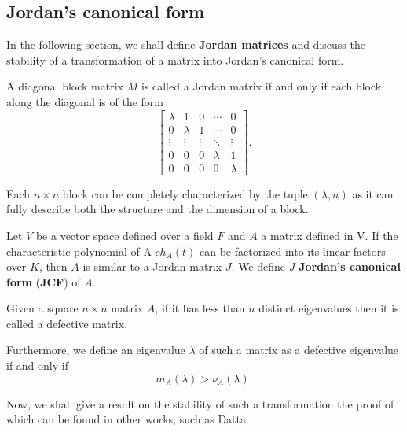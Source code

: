 \subsection*{Jordan's canonical form}
In the following section, we shall define \textbf{Jordan matrices} and discuss the stability of a transformation of a matrix
into Jordan's canonical form.
\begin{definition}
    A diagonal block matrix $M$ is called a Jordan matrix if and only if each block along the diagonal is of the form
    \[
        \begin{bmatrix}
            \lambda     &    1         &    0     &   \cdots   &    0    \\
                0       &    \lambda   &    1     &   \cdots   &    0    \\
            \vdots      &    \vdots    &  \vdots  &   \ddots   & \vdots  \\
                0       &       0      &     0    &  \lambda   &    1    \\
                0       &       0      &     0    &     0      & \lambda
        \end{bmatrix}.
    \]

    Each \(n \times n\) block can be completely characterized by the tuple \((\lambda, n)\) as it can fully describe both
    the structure and the dimension of a block.
\end{definition}

\begin{remark}
    Let \(V\) be a vector space defined over a field \(F\) and \(A\) a matrix defined in V. If the characteristic
    polynomial of A \(ch_{A}(t)\) can be factorized into its linear factors over \(K\), then \(A\) is similar to a
    Jordan matrix \(J\). We define \(J\) \textbf{Jordan's canonical form} (\textbf{JCF}) of \(A\).
\end{remark}

\begin{definition}
    Given a square \(n \times n\) matrix \(A\), if it has less than \(n\) distinct eigenvalues then it is called a
    defective matrix.

    Furthermore, we define an eigenvalue \(\lambda\) of such a matrix as a defective eigenvalue if and only if
    \[
        m_{A}(\lambda) > \nu_{A}(\lambda).
    \]
\end{definition}

Now, we shall give a result on the stability of such a transformation the proof of which can be found in other works, such as
Datta \cite{biswadatta}.

